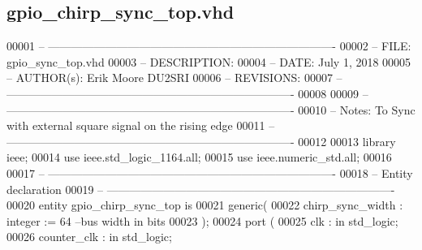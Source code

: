\subsection{gpio\+\_\+chirp\+\_\+sync\+\_\+top.\+vhd}
\label{gpio__chirp__sync__top_8vhd_source}

\begin{DoxyCode}
00001 \textcolor{keyword}{-- ---------------------------------------------------------------------------- }
00002 \textcolor{keyword}{-- FILE:    gpio\_sync\_top.vhd}
00003 \textcolor{keyword}{-- DESCRIPTION:  }
00004 \textcolor{keyword}{-- DATE:    July 1, 2018}
00005 \textcolor{keyword}{-- AUTHOR(s):   Erik Moore DU2SRI}
00006 \textcolor{keyword}{-- REVISIONS:}
00007 \textcolor{keyword}{-- ---------------------------------------------------------------------------- }
00008 
00009 \textcolor{keyword}{-- ----------------------------------------------------------------------------}
00010 \textcolor{keyword}{-- Notes: To Sync with external square signal on the rising edge}
00011 \textcolor{keyword}{-- ----------------------------------------------------------------------------}
00012 
00013 \textcolor{vhdlkeyword}{library }\textcolor{keywordflow}{ieee};
00014 \textcolor{vhdlkeyword}{use }ieee.std\_logic\_1164.\textcolor{keywordflow}{all};
00015 \textcolor{vhdlkeyword}{use }ieee.numeric\_std.\textcolor{keywordflow}{all};
00016 
00017 \textcolor{keyword}{-- ----------------------------------------------------------------------------}
00018 \textcolor{keyword}{-- Entity declaration}
00019 \textcolor{keyword}{-- ----------------------------------------------------------------------------}
00020 \textcolor{keywordflow}{entity }gpio_chirp_sync_top \textcolor{keywordflow}{is}
00021    \textcolor{keywordflow}{generic}\textcolor{vhdlchar}{(}
00022       \textcolor{vhdlchar}{chirp_sync_width}      \textcolor{vhdlchar}{:} \textcolor{comment}{integer} \textcolor{vhdlchar}{:=} \textcolor{vhdllogic}{}\textcolor{vhdllogic}{64}\textcolor{keyword}{ --bus width in bits  }
00023    \textcolor{vhdlchar}{)};
00024    \textcolor{keywordflow}{port} \textcolor{vhdlchar}{(}
00025       \textcolor{vhdlchar}{clk}                   \textcolor{vhdlchar}{:} \textcolor{keywordflow}{in} \textcolor{comment}{std\_logic};
00026         \textcolor{vhdlchar}{counter_clk}             \textcolor{vhdlchar}{:} \textcolor{keywordflow}{in} \textcolor{comment}{std\_logic};

\end{DoxyCode}
